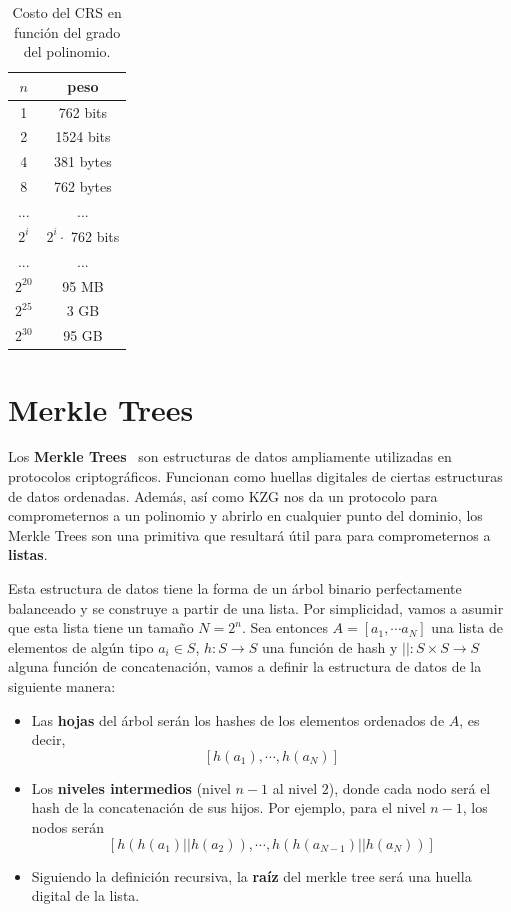\begin{table}
\begin{center}
\begin{tabular}{cc}
\toprule
$n$ & peso \\
\midrule
1 & 762 bits \\
2 & 1524 bits \\
4 & 381 bytes \\
8 & 762 bytes \\
... & ... \\
$2^i$ & $2^i \cdot$ 762 bits \\
... & ... \\
$2^{20}$ & 95 MB \\
$2^{25}$ & 3 GB \\
$2^{30}$ & 95 GB \\
\bottomrule
\end{tabular}
\caption{Costo del CRS en función del grado del polinomio.}
\label{tab:costo_crs}
\end{center}
\end{table}

\section{Merkle Trees}\label{sec:merkle_tree}
Los \textbf{Merkle Trees}~\cite{merkle1989certified} son estructuras de datos ampliamente utilizadas en protocolos criptográficos. Funcionan como huellas digitales de ciertas estructuras de datos ordenadas. Además, así como KZG nos da un protocolo para comprometernos a un polinomio y abrirlo en cualquier punto del dominio, los Merkle Trees son una primitiva que resultará útil para para comprometernos a \textbf{listas}.

Esta estructura de datos tiene la forma de un árbol binario perfectamente balanceado y se construye a partir de una lista. Por simplicidad, vamos a asumir que esta lista tiene un tamaño $N=2^n$. Sea entonces $A = [a_1, \cdots a_N]$ una lista de elementos de algún tipo $a_i \in S$, $h: S \rightarrow S$ una función de hash y $||: S \times S \rightarrow S$ alguna función de concatenación, vamos a definir la estructura de datos de la siguiente manera:

\begin{itemize}
    \item Las \textbf{hojas} del árbol serán los hashes de los elementos ordenados de $A$, es decir, $$[h(a_1), \cdots, h(a_N)]$$
    \item Los \textbf{niveles intermedios} (nivel $n-1$ al nivel $2$), donde 
    cada nodo será el hash de la concatenación de sus hijos. Por ejemplo, para el nivel $n-1$, los nodos serán $$[h(h(a_1)|| h(a_2)), \cdots, h(h(a_{N-1})||h(a_{N}))]$$
    \item Siguiendo la definición recursiva, la \textbf{raíz} del merkle tree será una huella digital de la lista. 
\end{itemize}

